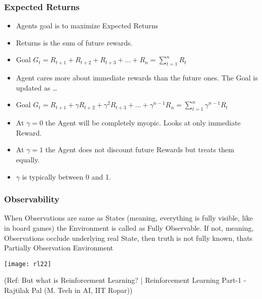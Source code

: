 \begin{frame}[fragile]\frametitle{Expected Returns}

\begin{itemize}
\item Agents goal is to maximize Expected Returns
\item Returns is the sum of future rewards.
\item Goal $G_t= R_{t+1} + R_{t+2} + R_{t+3} + \ldots + R_n = \sum_{t=1}^{n}R_t$
\item Agent cares more about immediate rewards than the future ones. The Goal is updated as \ldots
\item Goal $G_t= R_{t+1} + \gamma R_{t+2} + \gamma^2 R_{t+3} + \ldots + \gamma^{n-1}R_n = \sum_{t=1}^{n}\gamma^{n-1}R_t$
\item At $\gamma = 0$ the Agent will be completely myopic. Looks at only immediate Reward.
\item At $\gamma = 1$ the Agent does not discount future Rewards but treats them equally.
\item $\gamma$ is typically between 0 and 1.

\end{itemize}

\end{frame}

\begin{frame}[fragile]\frametitle{Observability}
When Observations are same as States (meaning, everything is fully visible, like in board games) the Environment is called as Fully Observable. If not, meaning, Observations occlude underlying real State, then truth is not fully known, thats Partially Observation Environment

\begin{center}
\texttt{[image: rl22]}
\end{center}

{\tiny (Ref: But what is Reinforcement Learning? | Reinforcement Learning Part-1 - Rajtilak Pal (M. Tech in AI, IIT Ropar))}

\end{frame}


